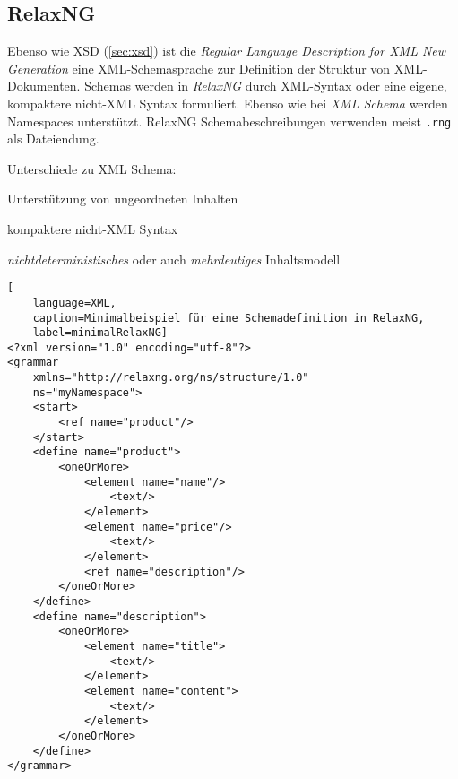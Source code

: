 \subsection{RelaxNG}
\label{sec:relaxng}

Ebenso wie XSD (\cref{sec:xsd}) ist die \emph{Regular Language Description for XML New Generation} eine XML-Schemasprache zur Definition der Struktur von XML-Dokumenten. 
Schemas werden in \emph{RelaxNG} durch XML-Syntax oder eine eigene, kompaktere nicht-XML Syntax formuliert. Ebenso wie bei \emph{XML Schema} werden Namespaces unterstützt. RelaxNG Schemabeschreibungen verwenden meist \texttt{.rng} als Dateiendung.

Unterschiede zu XML Schema:
\begin{compactitem}
    \item Unterstützung von ungeordneten Inhalten
    \item kompaktere nicht-XML Syntax
    \item \emph{nichtdeterministisches} oder auch \emph{mehrdeutiges} Inhaltsmodell \cite[Kapitel 16]{RelaxNGVlist}    
\end{compactitem}

\begin{lstlisting}[
    language=XML, 
    caption=Minimalbeispiel für eine Schemadefinition in RelaxNG, 
    label=minimalRelaxNG]
<?xml version="1.0" encoding="utf-8"?>
<grammar 
    xmlns="http://relaxng.org/ns/structure/1.0"
    ns="myNamespace">
    <start>
        <ref name="product"/>
    </start>
    <define name="product">
        <oneOrMore>
            <element name="name"/>
                <text/>
            </element>
            <element name="price"/>
                <text/>
            </element>
            <ref name="description"/>
        </oneOrMore>
    </define>
    <define name="description">
        <oneOrMore>
            <element name="title">
                <text/>
            </element>
            <element name="content">
                <text/>
            </element>
        </oneOrMore>
    </define>
</grammar>
\end{lstlisting}
